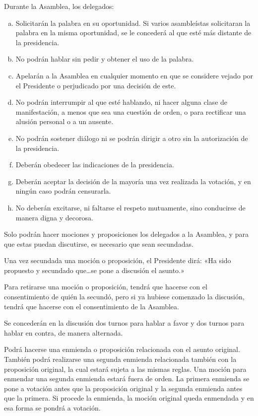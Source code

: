 \article
Durante la Asamblea, los delegados:
\begin{enumerate}[a)]
    \item Solicitarán la palabra en su oportunidad. Si varios asambleístas solicitaran la palabra en la misma oportunidad, se le concederá al que esté más distante de la presidencia.
    \item No podrán hablar sin pedir y obtener el uso de la palabra.
    \item Apelarán a la Asamblea en cualquier momento en que se considere vejado por el Presidente o perjudicado por una decisión de este.
    \item No podrán interrumpir al que esté hablando, ni hacer alguna clase de manifestación, a menos que sea una cuestión de orden, o para rectificar una alusión personal o a un ausente.
    \item No podrán sostener diálogo ni se podrán dirigir a otro sin la autorización de la presidencia.
    \item Deberán obedecer las indicaciones de la presidencia.
    \item Deberán aceptar la decisión de la mayoría una vez realizada la votación, y en ningún caso podrán censurarla.
    \item No deberán excitarse, ni faltarse el respeto mutuamente, sino conducirse de manera digna y decorosa.
\end{enumerate}


\article
Solo podrán hacer mociones y proposiciones los delegados a la Asamblea, y para que estas puedan discutirse, es necesario que sean secundadas.

\article
Una vez secundada una moción o proposición, el Presidente dirá: «Ha sido propuesto y secundado que\ldots se pone a discusión el asunto.»

\article
Para retirarse una moción o proposición, tendrá que hacerse con el consentimiento de quién la secundó, pero si ya hubiese comenzado la discusión, tendrá que hacerse con el consentimiento de la Asamblea.

\article
Se concederán en la discusión dos turnos para hablar a favor y dos turnos para hablar en contra, de manera alternada.

\article
Podrá hacerse una enmienda o proposición relacionada con el asunto original. También podrá realizarse una segunda enmienda relacionada también con la proposición original, la cual estará sujeta a las mismas reglas. Una moción para enmendar una segunda enmienda estará fuera de orden. La primera enmienda se pone a votación antes que la proposición original y la segunda enmienda antes que la primera. Si procede la enmienda, la moción original queda enmendada y en esa forma se pondrá a votación.

